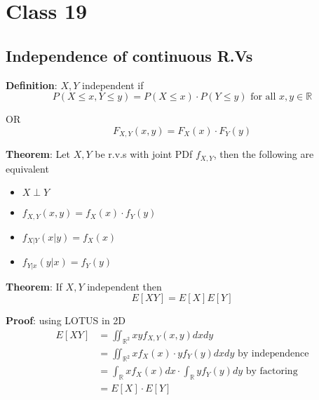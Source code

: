 \chapter{Class 19}

\section{Independence of continuous R.Vs}

\begin{framed}
   \textbf{Definition}: $X, Y$ independent if 
   \[
      P(X \leq x,Y \leq y) = P(X \leq x) \cdot P(Y \leq y) \text{ for all } x, y \in \mathbb{R}
   \] 

   OR
   \[
      F_{X, Y}(x, y) = F_X(x) \cdot F_Y(y)
   \] 
\end{framed}

\begin{framed}
   \textbf{Theorem}: Let $X, Y$ be r.v.s with joint PDf $f_{X, Y}$, then the following are equivalent
   \begin{itemize}
      \item $X \perp Y$ 
      \item  $f_{X, Y}(x, y) = f_X(x) \cdot f_Y(y)$ 
      \item $f_{X|Y}(x|y)  = f_X(x)$
      \item $f_{Y|x}(y|x)  = f_Y(y)$
   \end{itemize}
\end{framed}

\begin{framed}
   \textbf{Theorem}: If $X, Y$ independent then
   \[
     E\left[ XY\right]  = E\left[ X\right]  E\left[ Y\right] 
   \] 

   \textbf{Proof}: using LOTUS in 2D
   \begin{align*}
      E\left[ XY\right] &= \iint_{\mathbb{R}^2} xy f_{X, Y}(x, y) dx dy \\
                        &= \iint_{\mathbb{R}^2} xf_X(x) \cdot yf_Y(y) dx dy \text{ by independence} \\
                        &= \int_{\mathbb{R}}^{}  xf_X(x) dx \cdot \int_{\mathbb{R}}^{} yf_Y(y) dy \text{ by factoring}   \\
                        &= E\left[ X\right]  \cdot E\left[ Y\right] 
   \end{align*}
   

  
\end{framed}


